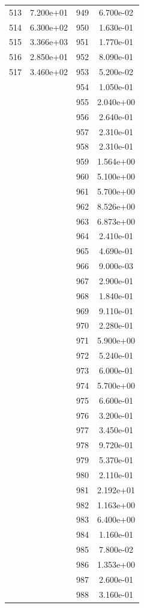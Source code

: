 \documentclass[12pt]{article}
\begin{document}
\begin{longtable}{@{}cccc@{}}
513 & 7.200e+01 & 949 & 6.700e-02 \\
514 & 6.300e+02 & 950 & 1.630e-01 \\
515 & 3.366e+03 & 951 & 1.770e-01 \\
516 & 2.850e+01 & 952 & 8.090e-01 \\
517 & 3.460e+02 & 953 & 5.200e-02 \\
 &  & 954 & 1.050e-01 \\
 &  & 955 & 2.040e+00 \\
 &  & 956 & 2.640e-01 \\
 &  & 957 & 2.310e-01 \\
 &  & 958 & 2.310e-01 \\
 &  & 959 & 1.564e+00 \\
 &  & 960 & 5.100e+00 \\
 &  & 961 & 5.700e+00 \\
 &  & 962 & 8.526e+00 \\
 &  & 963 & 6.873e+00 \\
 &  & 964 & 2.410e-01 \\
 &  & 965 & 4.690e-01 \\
 &  & 966 & 9.000e-03 \\
 &  & 967 & 2.900e-01 \\
 &  & 968 & 1.840e-01 \\
 &  & 969 & 9.110e-01 \\
 &  & 970 & 2.280e-01 \\
 &  & 971 & 5.900e+00 \\
 &  & 972 & 5.240e-01 \\
 &  & 973 & 6.000e-01 \\
 &  & 974 & 5.700e+00 \\
 &  & 975 & 6.600e-01 \\
 &  & 976 & 3.200e-01 \\
 &  & 977 & 3.450e-01 \\
 &  & 978 & 9.720e-01 \\
 &  & 979 & 5.370e-01 \\
 &  & 980 & 2.110e-01 \\
 &  & 981 & 2.192e+01 \\
 &  & 982 & 1.163e+00 \\
 &  & 983 & 6.400e+00 \\
 &  & 984 & 1.160e-01 \\
 &  & 985 & 7.800e-02 \\
 &  & 986 & 1.353e+00 \\
 &  & 987 & 2.600e-01 \\
 &  & 988 & 3.160e-01 \\

\end{longtable}
\end{document}
